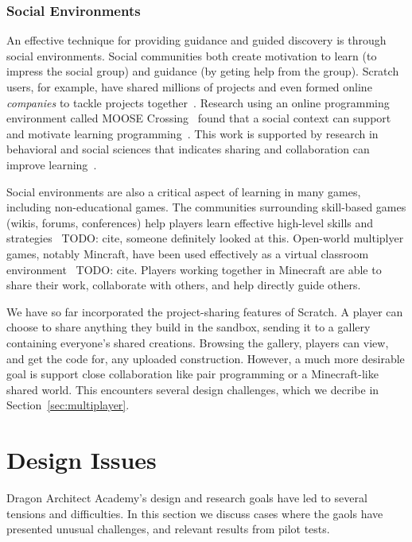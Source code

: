 \documentclass{sig-alternate}
\newcommand{\TODO}[1]{{\color{red} TODO: #1}}
\newcommand{\gametitle}{{\color{RoyalPurple} Dragon Architect Academy}}
\begin{document}
\subsubsection{Social Environments}
\label{sec:social}

An effective technique for providing guidance and guided discovery is through social environments.
Social communities both create motivation to learn (to impress the social group) and guidance (by geting help from the group).
Scratch users, for example, have shared millions of projects and even formed online \emph{companies} to tackle projects together~\cite{resnick2009scratch}. 
Research using an online programming environment called MOOSE Crossing~\cite{bruckman1997moose} found that a social context can support and motivate learning programming~\cite{bruckman2000situated}.
This work is supported by research in behavioral and social sciences that indicates sharing and collaboration can improve learning~\cite{bransford2000people}. 

Social environments are also a critical aspect of learning in many games, including non-educational games.
The communities surrounding skill-based games (wikis, forums, conferences) help players learn effective high-level skills and strategies~\TODO{cite, someone definitely looked at this}.
Open-world multiplyer games, notably Mincraft, have been used effectively as a virtual classroom environment~\TODO{cite}.
Players working together in Minecraft are able to share their work, collaborate with others, and help directly guide others.

We have so far incorporated the project-sharing features of Scratch.
A player can choose to share anything they build in the sandbox, sending it to a gallery containing everyone's shared creations.
Browsing the gallery, players can view, and get the code for, any uploaded construction.
However, a much more desirable goal is support close collaboration like pair programming or a Minecraft-like shared world.
This encounters several design challenges, which we decribe in Section~\ref{sec:multiplayer}.

\section{Design Issues}
\gametitle{}'s design and research goals have led to several tensions and difficulties.
In this section we discuss cases where the gaols have presented unusual challenges, and relevant results from pilot tests.
\end{document}
